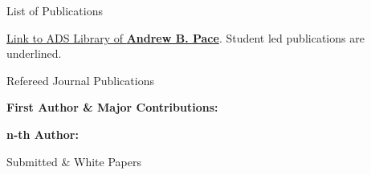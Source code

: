 \documentclass{resume} %
\begin{document}

\begin{rSection}{List of Publications} \itemsep -3pt
\end{rSection}







\href{https://ui.adsabs.harvard.edu/public-libraries/hJ77Di5nQ0qwHYNpG0yRpA}{Link to ADS Library of {\bf Andrew B. Pace}}. Student led publications are underlined.

\begin{rSection}{Refereed Journal Publications}


{\bf First Author \& Major Contributions:}



{\bf n-th Author:}



\end{rSection}

\begin{rSection}{Submitted \& White Papers} \itemsep -3pt



\end{rSection}
\end{document}
